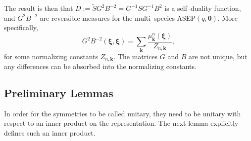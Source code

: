 \documentclass{ximera}
\begin{document}
The result is then that $D:= \tilde{S}G^2B^{-2} =  G^{-1}SG^{-1}B^2$ is a self--duality function, and $G^2B^{-2}$ are reversible measures for the multi--species ASEP$(q,\boldsymbol\theta)$. More specifically, 
\begin{equation}\label{GB}
G^2B^{-2}(\boldsymbol\xi,\boldsymbol\xi) = \sum_{\boldsymbol k} \frac{\mu_{\boldsymbol k}^n(\boldsymbol\xi)}{Z_{n,\boldsymbol k}},
\end{equation}
for some normalizing constants $Z_{n,\boldsymbol k}$. The matrices $G$ and $B$ are not unique, but any differences can be absorbed into the normalizing constants. 

\subsection{Preliminary Lemmas}

 In order for the symmetries to be called unitary, they need to be unitary with respect to an inner product on the representation. The next lemma explicitly defines such an inner product.
\end{document}
